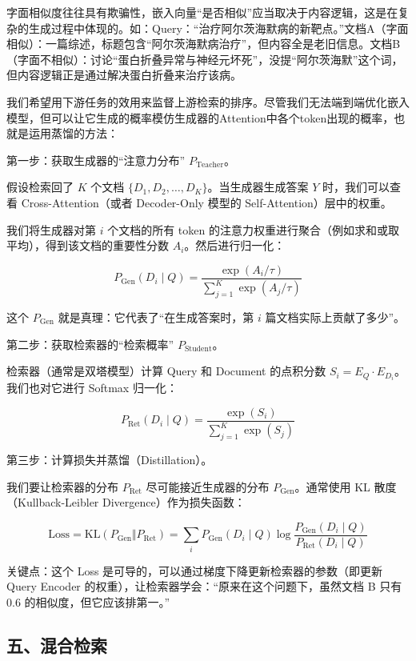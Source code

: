 字面相似度往往具有欺骗性，嵌入向量``是否相似''应当取决于内容逻辑，这是在复杂的生成过程中体现的。如：Query：``治疗阿尔茨海默病的新靶点。''文档A（字面相似）：一篇综述，标题包含``阿尔茨海默病治疗''，但内容全是老旧信息。文档B（字面不相似）：讨论``蛋白折叠异常与神经元坏死''，没提``阿尔茨海默''这个词，但内容逻辑正是通过解决蛋白折叠来治疗该病。

我们希望用下游任务的效用来监督上游检索的排序。尽管我们无法端到端优化嵌入模型，但可以让它生成的概率模仿生成器的Attention中各个token出现的概率，也就是运用蒸馏的方法：

第一步：获取生成器的``注意力分布'' \(P_{\mathrm{Teacher}}\)。

假设检索回了 \(K\) 个文档 \(\{D_1,D_2,\ldots,D_K\}\)。当生成器生成答案 \(Y\) 时，我们可以查看 Cross-Attention（或者 Decoder-Only 模型的 Self-Attention）层中的权重。

我们将生成器对第 \(i\) 个文档的所有 token 的注意力权重进行聚合（例如求和或取平均），得到该文档的重要性分数 \(A_i\)。然后进行归一化：

\[
P_{\mathrm{Gen}}(D_i\mid Q)=\frac{\exp(A_i/\tau)}{\sum_{j=1}^{K}\exp(A_j/\tau)}
\]

这个 \(P_{\mathrm{Gen}}\) 就是真理：它代表了``在生成答案时，第 \(i\) 篇文档实际上贡献了多少''。

第二步：获取检索器的``检索概率'' \(P_{\mathrm{Student}}\)。

检索器（通常是双塔模型）计算 Query 和 Document 的点积分数 \(S_i=E_Q\cdot E_{D_i}\)。我们也对它进行 Softmax 归一化：

\[
P_{\mathrm{Ret}}(D_i\mid Q)=\frac{\exp(S_i)}{\sum_{j=1}^{K}\exp(S_j)}
\]

第三步：计算损失并蒸馏（Distillation）。

我们要让检索器的分布 \(P_{\mathrm{Ret}}\) 尽可能接近生成器的分布 \(P_{\mathrm{Gen}}\)。通常使用 KL 散度（Kullback-Leibler Divergence）作为损失函数：

\[
\mathrm{Loss}=\mathrm{KL}(P_{\mathrm{Gen}}\Vert P_{\mathrm{Ret}})=\sum_i P_{\mathrm{Gen}}(D_i\mid Q)\log\frac{P_{\mathrm{Gen}}(D_i\mid Q)}{P_{\mathrm{Ret}}(D_i\mid Q)}
\]

关键点：这个 Loss 是可导的，可以通过梯度下降更新检索器的参数（即更新 Query Encoder 的权重），让检索器学会：``原来在这个问题下，虽然文档 B 只有 \(0.6\) 的相似度，但它应该排第一。''

\hypertarget{ux4e94ux6df7ux5408ux68c0ux7d22}{%
\subsection{五、混合检索}\label{ux4e94ux6df7ux5408ux68c0ux7d22}}

